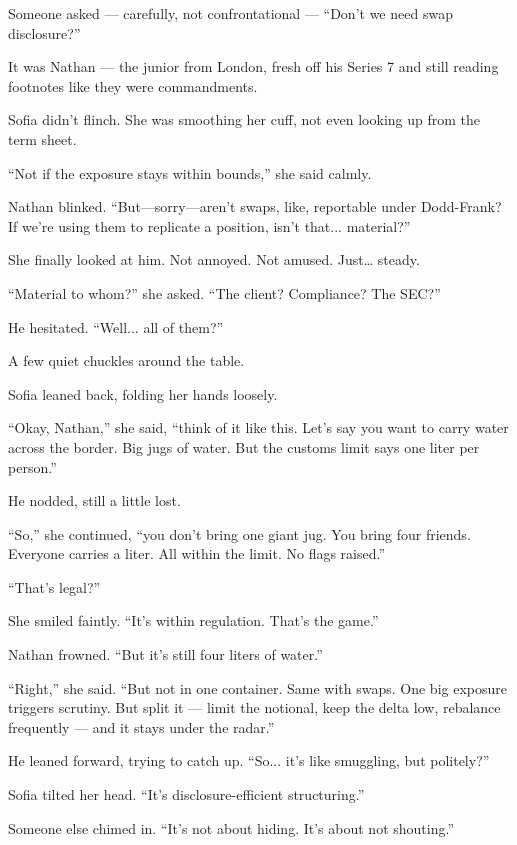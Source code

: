 \medskip








Someone asked — carefully, not confrontational —
“Don’t we need swap disclosure?”

It was Nathan — the junior from London, fresh off his Series 7 and still reading footnotes like they 
were commandments.

Sofia didn’t flinch. She was smoothing her cuff, not even looking up from the term sheet.

“Not if the exposure stays within bounds,” she said calmly.

Nathan blinked. “But—sorry—aren’t swaps, like, reportable under Dodd-Frank? If we’re using them to 
replicate a position, isn’t that... material?”

She finally looked at him. Not annoyed. Not amused. Just… steady.

“Material to whom?” she asked. “The client? Compliance? The SEC?”

He hesitated. “Well... all of them?”

A few quiet chuckles around the table.

Sofia leaned back, folding her hands loosely.

“Okay, Nathan,” she said, “think of it like this. Let’s say you want to carry water across the border. 
Big jugs of water. But the customs limit says one liter per person.”

He nodded, still a little lost.

“So,” she continued, “you don’t bring one giant jug. You bring four friends. Everyone carries a liter. 
All within the limit. No flags raised.”

“That’s legal?”

She smiled faintly. “It’s within regulation. That’s the game.”

Nathan frowned. “But it’s still four liters of water.”

“Right,” she said. “But not in one container. Same with swaps. One big exposure triggers scrutiny. 
But split it — limit the notional, keep the delta low, rebalance frequently — and it stays under the 
radar.”

He leaned forward, trying to catch up. “So... it’s like smuggling, but politely?”

Sofia tilted her head. “It’s disclosure-efficient structuring.”

Someone else chimed in. “It’s not about hiding. It’s about not shouting.”

